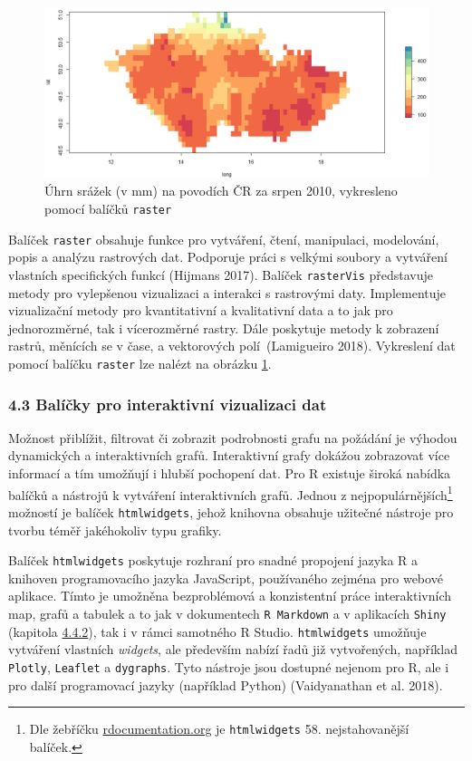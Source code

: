 \documentclass[12pt,]{article}
\let\rmarkdownfootnote\footnote%
\def\footnote{\protect\rmarkdownfootnote}
\begin{document}
\begin{figure}[H]
  \centering
      \includegraphics[width=\textwidth]{fig/raster_map2}
      \caption{Úhrn srážek (v mm) na povodích ČR za srpen 2010, vykresleno pomocí balíčků \texttt{raster}} 
      \label{fig:ch4.3}
\end{figure}

\qquad Balíček \texttt{raster} obsahuje funkce pro vytváření, čtení,
manipulaci, modelování, popis a analýzu rastrových dat. Podporuje práci
s velkými soubory a vytváření vlastních specifických funkcí (Hijmans
2017). Balíček \texttt{rasterVis} představuje metody pro vylepšenou
vizualizaci a interakci s rastrovými daty. Implementuje vizualizační
metody pro kvantitativní a kvalitativní data a to jak pro jednorozměrné,
tak i vícerozměrné rastry. Dále poskytuje metody k zobrazení rastrů,
měnících se v čase, a vektorových polí~(Lamigueiro 2018). Vykreslení dat
pomocí balíčku \texttt{raster} lze nalézt na obrázku \ref{fig:ch4.3}.

\hypertarget{htmlwidgets}{\subsubsection{4.3 Balíčky pro interaktivní
vizualizaci dat}\label{htmlwidgets}}

\qquad Možnost přiblížit, filtrovat či zobrazit podrobnosti grafu na
požádání je výhodou dynamických a interaktivních grafů. Interaktivní
grafy dokážou zobrazovat více informací a tím umožňují i hlubší
pochopení dat. Pro R existuje široká nabídka balíčků a nástrojů k
vytváření interaktivních grafů. Jednou z nejpopulárnějších\footnote{Dle
  žebříčku \href{https://www.rdocumentation.org/}{rdocumentation.org} je
  \texttt{htmlwidgets} 58. nejstahovanější balíček.} možností je balíček
\texttt{htmlwidgets}, jehož knihovna obsahuje užitečné nástroje pro
tvorbu téměř jakéhokoliv typu grafiky.

\qquad Balíček \texttt{htmlwidgets} poskytuje rozhraní pro snadné
propojení jazyka R a knihoven programovacího jazyka JavaScript,
používaného zejména pro webové aplikace. Tímto je umožněna bezproblémová
a konzistentní práce interaktivních map, grafů a tabulek a to jak v
dokumentech \texttt{R\ Markdown} a v aplikacích \texttt{Shiny} (kapitola
\protect\hyperlink{shiny}{4.4.2}), tak i v rámci samotného R Studio.
\texttt{htmlwidgets} umožňuje vytváření vlastních \emph{widgets}, ale
především nabízí řadů již vytvořených, například \texttt{Plotly},
\texttt{Leaflet} a \texttt{dygraphs}. Tyto nástroje jsou dostupné
nejenom pro R, ale i pro další programovací jazyky (například Python)
(Vaidyanathan et al. 2018).
\end{document}
